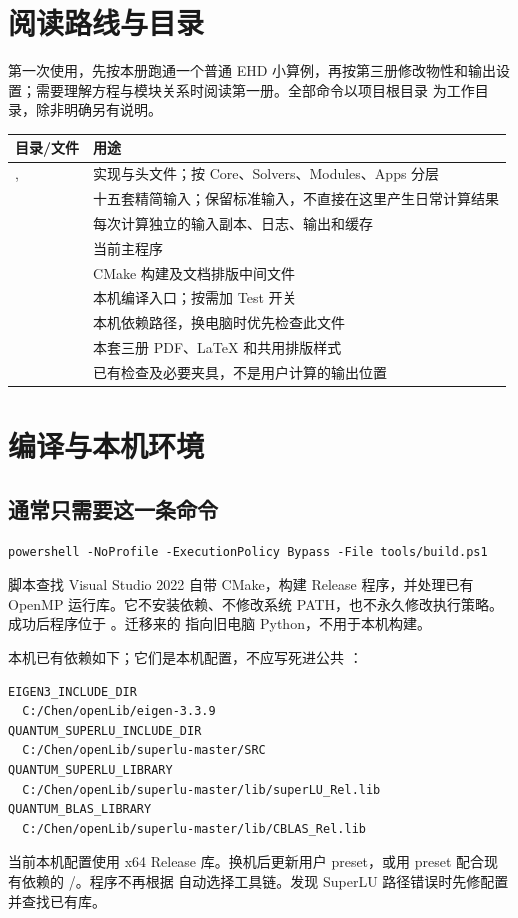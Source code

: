 \documentclass[a4paper,11pt]{article}
\begin{document}

\section{阅读路线与目录}
第一次使用，先按本册跑通一个普通 EHD 小算例，再按第三册修改物性和输出设置；需要理解方程与模块关系时阅读第一册。全部命令以项目根目录  为工作目录，除非明确另有说明。

\begin{longtable}{L{.23\linewidth}L{.69\linewidth}}
\toprule 目录/文件 & 用途 \\\midrule\endhead
{},  & 实现与头文件；按 Core、Solvers、Modules、Apps 分层 \\
 & 十五套精简输入；保留标准输入，不直接在这里产生日常计算结果 \\
 & 每次计算独立的输入副本、日志、输出和缓存 \\
 & 当前主程序 \\
 & CMake 构建及文档排版中间文件 \\
 & 本机编译入口；按需加 Test 开关 \\
 & 本机依赖路径，换电脑时优先检查此文件 \\
 & 本套三册 PDF、LaTeX 和共用排版样式 \\
 & 已有检查及必要夹具，不是用户计算的输出位置 \\
\bottomrule
\end{longtable}

\section{编译与本机环境}
\subsection{通常只需要这一条命令}
\begin{lstlisting}
powershell -NoProfile -ExecutionPolicy Bypass -File tools/build.ps1
\end{lstlisting}
脚本查找 Visual Studio 2022 自带 CMake，构建 Release 程序，并处理已有 OpenMP 运行库。它不安装依赖、不修改系统 PATH，也不永久修改执行策略。成功后程序位于 。迁移来的  指向旧电脑 Python，不用于本机构建。

本机已有依赖如下；它们是本机配置，不应写死进公共 ：
\begin{lstlisting}
EIGEN3_INCLUDE_DIR
  C:/Chen/openLib/eigen-3.3.9
QUANTUM_SUPERLU_INCLUDE_DIR
  C:/Chen/openLib/superlu-master/SRC
QUANTUM_SUPERLU_LIBRARY
  C:/Chen/openLib/superlu-master/lib/superLU_Rel.lib
QUANTUM_BLAS_LIBRARY
  C:/Chen/openLib/superlu-master/lib/CBLAS_Rel.lib
\end{lstlisting}
当前本机配置使用 x64 Release 库。换机后更新用户 preset，或用  preset 配合现有依赖的 /。程序不再根据  自动选择工具链。发现 SuperLU 路径错误时先修配置并查找已有库。
\end{document}
